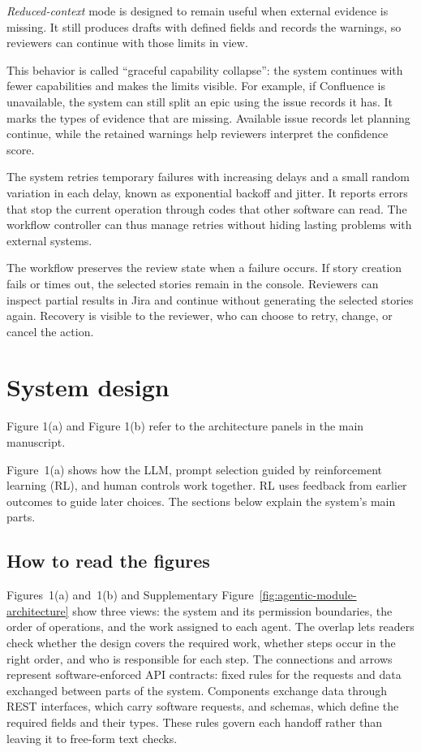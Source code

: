 \documentclass[10pt,a4paper]{article}
\begin{document}
\textit{Reduced-context} mode is designed to remain useful when external evidence is missing. It still produces drafts with defined fields and records the warnings, so reviewers can continue with those limits in view.

This behavior is called ``graceful capability collapse'': the system continues with fewer capabilities and makes the limits visible. For example, if Confluence is unavailable, the system can still split an epic using the issue records it has. It marks the types of evidence that are missing. Available issue records let planning continue, while the retained warnings help reviewers interpret the confidence score.

The system retries temporary failures with increasing delays and a small random variation in each delay, known as exponential backoff and jitter. It reports errors that stop the current operation through codes that other software can read. The workflow controller can thus manage retries without hiding lasting problems with external systems.

The workflow preserves the review state when a failure occurs. If story creation fails or times out, the selected stories remain in the console. Reviewers can inspect partial results in Jira and continue without generating the selected stories again. Recovery is visible to the reviewer, who can choose to retry, change, or cancel the action.


\FloatBarrier
\section{System design}
Figure 1(a) and Figure 1(b) refer to the architecture panels in the main manuscript.

Figure~1(a) shows how the LLM, prompt selection guided by reinforcement learning (RL), and human controls work together. RL uses feedback from earlier outcomes to guide later choices. The sections below explain the system's main parts.

\subsection{How to read the figures}
Figures~1(a) and~1(b) and Supplementary Figure~\ref{fig:agentic-module-architecture} show three views: the system and its permission boundaries, the order of operations, and the work assigned to each agent. The overlap lets readers check whether the design covers the required work, whether steps occur in the right order, and who is responsible for each step. The connections and arrows represent software-enforced API contracts: fixed rules for the requests and data exchanged between parts of the system. Components exchange data through REST interfaces, which carry software requests, and schemas, which define the required fields and their types. These rules govern each handoff rather than leaving it to free-form text checks.
\end{document}
